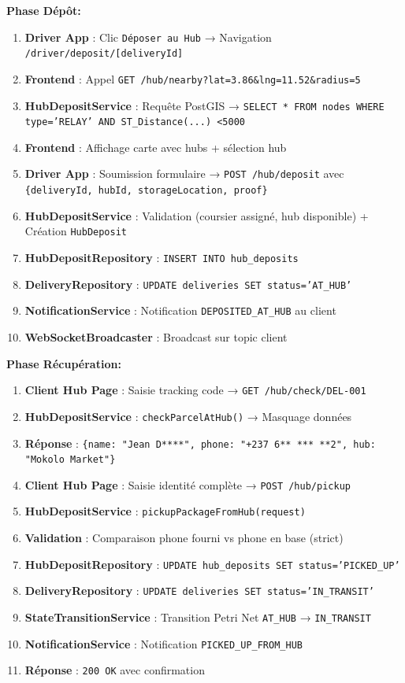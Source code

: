 \textbf{Phase Dépôt:}
\begin{enumerate}
    \item \textbf{Driver App} : Clic \texttt{Déposer au Hub} → Navigation \texttt{/driver/deposit/[deliveryId]}
    \item \textbf{Frontend} : Appel \texttt{GET /hub/nearby?lat=3.86\&lng=11.52\&radius=5}
    \item \textbf{HubDepositService} : Requête PostGIS → \texttt{SELECT * FROM nodes WHERE type='RELAY' AND ST\_Distance(...) \textless 5000}
    \item \textbf{Frontend} : Affichage carte avec hubs + sélection hub
    \item \textbf{Driver App} : Soumission formulaire → \texttt{POST /hub/deposit} avec \texttt{\{deliveryId, hubId, storageLocation, proof\}}
    \item \textbf{HubDepositService} : Validation (coursier assigné, hub disponible) + Création \texttt{HubDeposit}
    \item \textbf{HubDepositRepository} : \texttt{INSERT INTO hub\_deposits}
    \item \textbf{DeliveryRepository} : \texttt{UPDATE deliveries SET status='AT\_HUB'}
    \item \textbf{NotificationService} : Notification \texttt{DEPOSITED\_AT\_HUB} au client
    \item \textbf{WebSocketBroadcaster} : Broadcast sur topic client
\end{enumerate}

\textbf{Phase Récupération:}
\begin{enumerate}
    \item \textbf{Client Hub Page} : Saisie tracking code → \texttt{GET /hub/check/DEL-001}
    \item \textbf{HubDepositService} : \texttt{checkParcelAtHub()} → Masquage données
    \item \textbf{Réponse} : \texttt{\{name: "Jean D****", phone: "+237 6** *** **2", hub: "Mokolo Market"\}}
    \item \textbf{Client Hub Page} : Saisie identité complète → \texttt{POST /hub/pickup}
    \item \textbf{HubDepositService} : \texttt{pickupPackageFromHub(request)}
    \item \textbf{Validation} : Comparaison phone fourni vs phone en base (strict)
    \item \textbf{HubDepositRepository} : \texttt{UPDATE hub\_deposits SET status='PICKED\_UP'}
    \item \textbf{DeliveryRepository} : \texttt{UPDATE deliveries SET status='IN\_TRANSIT'}
    \item \textbf{StateTransitionService} : Transition Petri Net \texttt{AT\_HUB} → \texttt{IN\_TRANSIT}
    \item \textbf{NotificationService} : Notification \texttt{PICKED\_UP\_FROM\_HUB}
    \item \textbf{Réponse} : \texttt{200 OK} avec confirmation
\end{enumerate}

